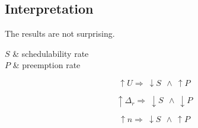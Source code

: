 \subsection{Interpretation}

The results are not surprising.

\begin{conditions}
	$S$ & schedulability rate\\
	$P$ & preemption rate
\end{conditions}

\begin{equation}
	\uparrow U \Rightarrow ~\downarrow S ~~\land ~\uparrow P
	\label{eq:U influence}
\end{equation}

\begin{equation}
	\uparrow \Delta_r \Rightarrow ~\downarrow S ~~\land ~\downarrow P
	\label{eq:d influence}
\end{equation}

\begin{equation}
	\uparrow n \Rightarrow ~\downarrow S ~~\land ~\uparrow P
	\label{eq:n influence}
\end{equation}
	